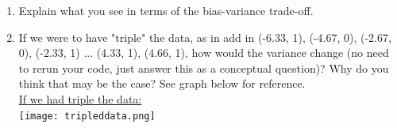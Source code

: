 \documentclass[submit]{harvardml}
\begin{document}
\begin{problem}
\begin{enumerate}
\item Explain what you see in terms of the bias-variance trade-off.

\item If we were to have "triple" the data, as in add in (-6.33, 1), (-4.67, 0), (-2.67, 0), (-2.33, 1) ... (4.33, 1), (4.66, 1), how would the variance change (no need to rerun your code, just answer this 
  as a conceptual question)? Why do you think that may be the case? See graph below for reference. \\
  
\underline{If we had triple the data:} \\

\texttt{[image: tripleddata.png]}
  
\end{enumerate}

\end{problem}

\newpage
\end{document}
